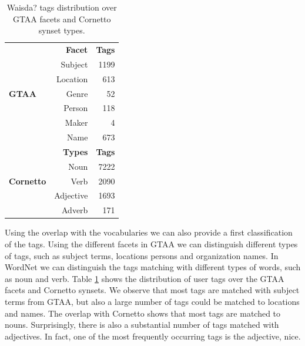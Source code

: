 \begin{table}[tb]
\centering
\begin{footnotesize}
\begin{tabular*}{\columnwidth}{@{\extracolsep{\fill}}lrr}
\toprule
\multirow{7}{*}{\textbf{GTAA}} & \textbf{Facet}\B \T & \textbf{Tags} \\
  \cline{2-3}
 & Subject \T \B & 1199\\
 & Location \B &  613 \\
 & Genre \B & 52\\
 & Person \B & 118\\
 & Maker \B & 4\\
 & Name \B & 673\\
\hline
\multirow{5}{*}{\textbf{Cornetto}} & \textbf{Types} \B \T & \textbf{Tags} \\
\cline{2-3}
 & Noun \T \B &  7222 \\
 & Verb \B & 2090 \\
 & Adjective \B & 1693\\
 & Adverb \B & 171\\
\bottomrule
\end{tabular*}
\end{footnotesize}
\caption{Waisda? tags distribution over GTAA facets and Cornetto synset types.}
\label{tag_dist_over_Cornetto_GTAA}
\end{table}

Using the overlap with the vocabularies we can also provide a first
classification of the tags. Using the different facets in GTAA we can
distinguish different types of tags, such as subject terms, locations persons
and organization names. In WordNet we can distinguish the tags matching with
different types of words, such as noun and verb. Table
\ref{tag_dist_over_Cornetto_GTAA} shows the distribution of user tags over the
GTAA facets and Cornetto synsets. We observe that most tags are matched with
subject terms from GTAA, but also a large number of tags could be matched to
locations and names. The overlap with Cornetto shows that most tags are
matched to nouns. Surprisingly, there is also a substantial number of tags
matched with adjectives. In fact, one of the most frequently occurring tags is
the adjective, nice.

